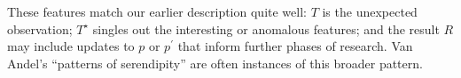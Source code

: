 These features match our earlier description quite well: $T$ is the
unexpected observation; $T^\star$ singles out the interesting or
anomalous features; and the result $R$ may include updates to $p$ or
$p^{\prime}$ that inform further phases of research.
%
Van Andel's \citeyear{van1994anatomy} ``patterns of serendipity'' are
often instances of this broader pattern.
